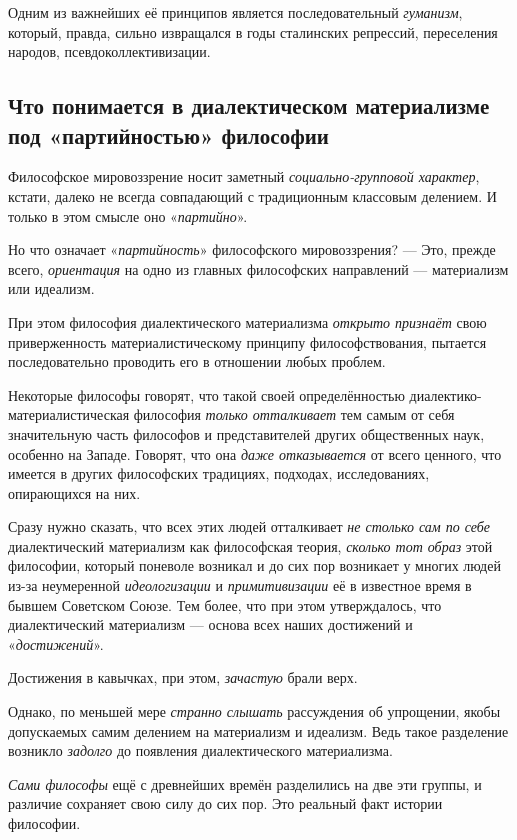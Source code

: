 \documentclass[a4paper,14pt,russian]{extreport}
\begin{document}
Одним из важнейших её принципов является последовательный \emph{гуманизм}, который, правда, сильно извращался в годы сталинских репрессий, переселения народов, псевдоколлективизации.

\subsection{Что понимается в диалектическом материализме под «партийностью» философии}

Философское мировоззрение носит заметный \emph{социально-групповой характер}, кстати, далеко не всегда совпадающий с традиционным классовым делением. И только в этом смысле оно «\emph{партийно}».

Но что означает «\emph{партийность}» философского мировоззрения? --- Это, прежде всего, \emph{ориентация} на одно из главных философских направлений --- материализм или идеализм.

При этом философия диалектического материализма \emph{открыто признаёт} свою приверженность материалистическому принципу философствования, пытается последовательно проводить его в отношении любых проблем.

Некоторые философы говорят, что такой своей определённостью диалектико-материалистическая философия \emph{только отталкивает} тем самым от себя значительную часть философов и представителей других общественных наук, особенно на Западе. Говорят, что она \emph{даже отказывается} от всего ценного, что имеется в других философских традициях, подходах, исследованиях, опирающихся на них.

Сразу нужно сказать, что всех этих людей отталкивает \emph{не столько сам по себе} диалектический материализм как философская теория, \emph{сколько тот образ} этой философии, который поневоле возникал и до сих пор возникает у многих людей из-за неумеренной \emph{идеологизации} и \emph{примитивизации} её в известное время в бывшем Советском Союзе. Тем более, что при этом утверждалось, что диалектический материализм --- основа всех наших достижений и «\emph{достижений}».

Достижения в кавычках, при этом, \emph{зачастую} брали верх.

Однако, по меньшей мере \emph{странно слышать} рассуждения об упрощении, якобы допускаемых самим делением на материализм и идеализм. Ведь такое разделение возникло \emph{задолго} до появления диалектического материализма.

\emph{Сами философы} ещё с древнейших времён разделились на две эти группы, и различие сохраняет свою силу до сих пор. Это реальный факт истории философии.
\end{document}
